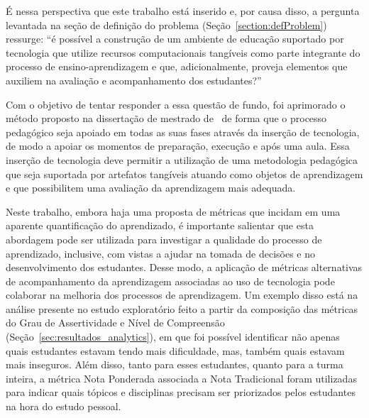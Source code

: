 
É nessa perspectiva que este trabalho está inserido e, por causa disso, a pergunta levantada na seção de definição do problema (Seção~\ref{section:defProblem}) ressurge: ``é possível a construção de um ambiente de educação suportado por tecnologia que utilize recursos computacionais tangíveis como parte integrante do processo de ensino-aprendizagem e que, adicionalmente, proveja elementos que auxiliem na avaliação e acompanhamento dos estudantes?''

Com o objetivo de tentar responder a essa questão de fundo, foi aprimorado o método proposto na dissertação de mestrado de~\cite{leitao:2017} de forma 
que o processo pedagógico seja apoiado em todas as suas fases através da inserção de tecnologia, de modo a apoiar os momentos de preparação, execução e após uma aula. Essa inserção de tecnologia 
deve permitir a utilização de uma metodologia pedagógica que seja suportada por artefatos tangíveis atuando como objetos de aprendizagem e que possibilitem uma avaliação da aprendizagem mais adequada.

Neste trabalho, embora haja uma proposta de métricas que incidam em uma aparente quantificação do aprendizado, é importante salientar que esta abordagem pode ser utilizada para investigar a qualidade do processo de aprendizado, inclusive, com vistas a ajudar na tomada de decisões e no desenvolvimento dos estudantes. Desse modo, a aplicação de métricas alternativas de acompanhamento da aprendizagem associadas ao uso de tecnologia pode colaborar na melhoria dos processos de aprendizagem. Um exemplo disso está na análise presente no estudo exploratório feito a partir da composição das métricas do Grau de Assertividade e Nível de Compreensão (Seção~\ref{sec:resultados_analytics}), em que foi possível identificar não apenas quais estudantes estavam tendo mais dificuldade, mas, também quais estavam mais inseguros. Além disso, tanto para esses estudantes, quanto para a turma inteira, a métrica Nota Ponderada associada a Nota Tradicional foram utilizadas para indicar quais tópicos e disciplinas precisam ser priorizados pelos estudantes na hora do estudo pessoal.

